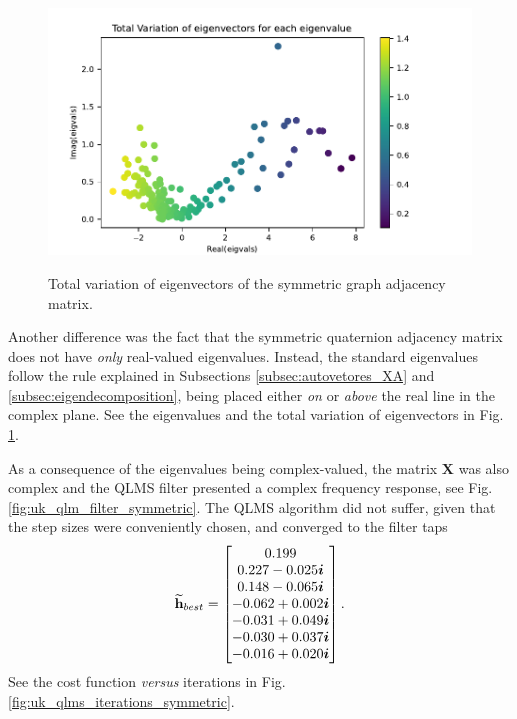 \begin{figure}
    \centering
    \caption{Total variation of eigenvectors of the symmetric graph adjacency matrix.}
    \includegraphics[width=0.7\linewidth]{Figures/uk_example/uk_total_variation_symmetric.pdf}
    \floatsource
    \label{fig:uk_total_variation_symmetric}
\end{figure}

Another difference was the fact that the symmetric quaternion adjacency matrix does not have \textit{only} real-valued eigenvalues. Instead, the standard eigenvalues follow the rule explained in Subsections \ref{subsec:autovetores_XA} and \ref{subsec:eigendecomposition}, being placed either \textit{on} or \textit{above} the real line in the complex plane. See the eigenvalues and the total variation of eigenvectors in Fig. \ref{fig:uk_total_variation_symmetric}.

As a consequence of the eigenvalues being complex-valued, the matrix $\mathbf{X}$ was also complex and the QLMS filter presented a complex frequency response, see Fig. \ref{fig:uk_qlm_filter_symmetric}.
The QLMS algorithm did not suffer, given that the step sizes were conveniently chosen, and converged to the filter taps
\begin{equation}
    \mathbf{\widetilde{h}}_{best} =
    \begin{bmatrix}
        0.199              \\
        0.227 -0.025\boldsymbol{i}    \\
        0.148 -0.065 \boldsymbol{i}   \\
        -0.062 + 0.002 \boldsymbol{i} \\
        -0.031 + 0.049 \boldsymbol{i} \\
        -0.030 + 0.037 \boldsymbol{i} \\
        -0.016 + 0.020 \boldsymbol{i}
    \end{bmatrix}.
\end{equation}
See the cost function \textit{versus} iterations in Fig. \ref{fig:uk_qlms_iterations_symmetric}.


